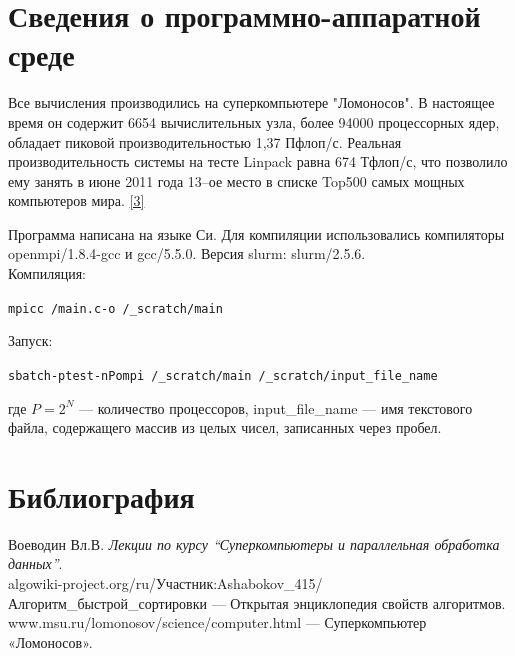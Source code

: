 \documentclass[a4paper, 12pt]{article}
\begin{document}
\section{Сведения о программно-аппаратной среде}
Все вычисления производились на суперкомпьютере "Ломоносов". В настоящее время он содержит 6654 вычислительных узла, более 94000 процессорных ядер, обладает пиковой производительностью 1,37 Пфлоп/с. Реальная производительность системы на тесте Linpack равна 674 Тфлоп/с, что позволило ему занять в июне 2011 года 13–ое место в списке Top500 самых мощных компьютеров мира. \hyperref[stat_3]{[3]} 

Программа написана на языке Си. Для компиляции использовались компиляторы openmpi/1.8.4-gcc и gcc/5.5.0. Версия slurm: slurm/2.5.6.\\

Компиляция: 

\begin{alltt}
mpicc ~/main.c -o ~/_scratch/main
\end{alltt}

Запуск: 

\begin{alltt}
sbatch -p test -n P ompi ~/\_scratch/main ~/_scratch/input_file_name
\end{alltt}
где $P = 2^N$ --- количество процессоров, input\_file\_name --- имя текстового файла, содержащего массив из целых чисел, записанных через пробел.

\newpage
\section{Библиография}

\begin{thebibliography}{2}
 Воеводин Вл.В. \textit{Лекции по курсу "`Суперкомпьютеры и параллельная обработка данных"'}.\\ 
 algowiki-project.org/ru/Участник:Ashabokov\_415/Алгоритм\_быстрой\_сортировки --- Открытая энциклопедия свойств алгоритмов.\\ \label{stat_1}
 www.msu.ru/lomonosov/science/computer.html --- Суперкомпьютер «Ломоносов».\\ \label{stat_3}
\end{thebibliography} 
\end{document}
